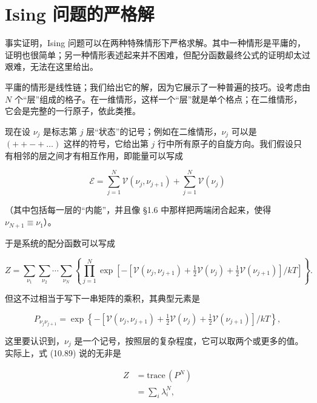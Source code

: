 
\section{Ising 问题的严格解}

事实证明，Ising 问题可以在两种特殊情形下严格求解。其中一种情形是平庸的，证明也很简单；另一种情形表述起来并不困难，但配分函数最终公式的证明却太过艰难，无法在这里给出。

平庸的情形是线性链；我们给出它的解，因为它展示了一种普遍的技巧。设考虑由 $N$ 个“层”组成的格子。在一维情形，这样一个“层”就是单个格点；在二维情形，它会是完整的一行原子，依此类推。

现在设 $\nu_j$ 是标志第 $j$ 层“状态”的记号；例如在二维情形，$\nu_j$ 可以是 $(++-+\ldots)$ 这样的符号，它给出第 $j$ 行中所有原子的自旋方向。我们假设只有相邻的层之间才有相互作用，即能量可以写成

\begin{equation*}
\mathcal{E} = \sum_{j=1}^{N} \mathcal{V}(\nu_j, \nu_{j+1}) + \sum_{j=1}^{N} \mathcal{V}(\nu_j)
\tag{10.88}
\end{equation*}

（其中包括每一层的“内能”，并且像 §1.6 中那样把两端闭合起来，使得 $\nu_{N+1} \equiv \nu_1$）。

于是系统的配分函数可以写成

\begin{equation*}
Z = \sum_{\nu_1}\sum_{\nu_2}\cdots\sum_{\nu_N}\left\{\prod_{j=1}^{N}\exp\left[-\left[\mathcal{V}(\nu_j, \nu_{j+1}) + \tfrac{1}{2}\mathcal{V}(\nu_j) + \tfrac{1}{2}\mathcal{V}(\nu_{j+1})\right]/kT\right]\right\}.
\tag{10.89}
\end{equation*}

但这不过相当于写下一串矩阵的乘积，其典型元素是

\begin{equation*}
P_{\nu_j\nu_{j+1}} = \exp\left\{-\left[\mathcal{V}(\nu_j, \nu_{j+1}) + \tfrac{1}{2}\mathcal{V}(\nu_j) + \tfrac{1}{2}\mathcal{V}(\nu_{j+1})\right]/kT\right\},
\tag{10.90}
\end{equation*}

这里要认识到，$\nu_j$ 是一个记号，按照层的复杂程度，它可以取两个或更多的值。实际上，式 (10.89) 说的无非是

\begin{align*}
Z &= \mathrm{trace}\,(P^N)\\
&= \sum_i \lambda_i^N,
\tag{10.91}
\end{align*}

